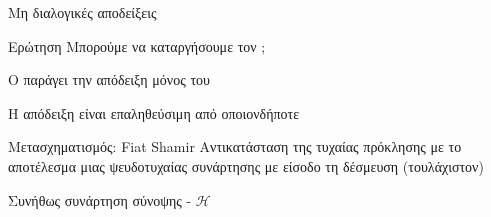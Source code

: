 \documentclass[handout]{beamer}
\begin{document}

\begin{frame}{Μη διαλογικές αποδείξεις}
\begin{block}{Ερώτηση}
Μπορούμε να καταργήσουμε τον \ver ;
\end{block}

O \prv παράγει την απόδειξη μόνος του

Η απόδειξη είναι επαληθεύσιμη από οποιονδήποτε

\begin{block}{Μετασχηματισμός: Fiat Shamir}
Αντικατάσταση της τυχαίας πρόκλησης με το αποτέλεσμα μιας ψευδοτυχαίας συνάρτησης με είσοδο τη δέσμευση (τουλάχιστον)

Συνήθως συνάρτηση σύνοψης - $\mathcal{H}$
\end{block}
\end{frame}
\end{document}

